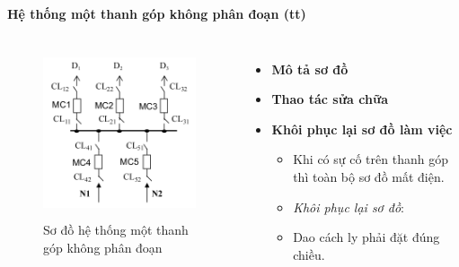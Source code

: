 \documentclass{beamer}
\begin{document}
\begin{frame}{\textbf{Hệ thống một thanh góp không phân đoạn (tt)}}
\begin{columns}
\begin{figure}[h]
\includegraphics[width=5cm, height=5cm]{mtgkpd}
\caption{Sơ đồ hệ thống một thanh góp không phân đoạn}
\end{figure}

\begin{itemize}
\item \textbf{Mô tả sơ đồ}
\item  \textbf{Thao tác sửa chữa}
\item \textbf{Khôi phục lại sơ đồ làm việc}
\begin{itemize}
\item<1-> Khi có sự cố trên thanh góp thì toàn bộ sơ đồ mất điện.
\item<2-> \emph{Khôi phục lại sơ đồ}: 
\item<4-> Dao cách ly phải đặt đúng chiều.
\end{itemize}
\end{itemize}
\end{columns}
\end{frame}
\end{document}
